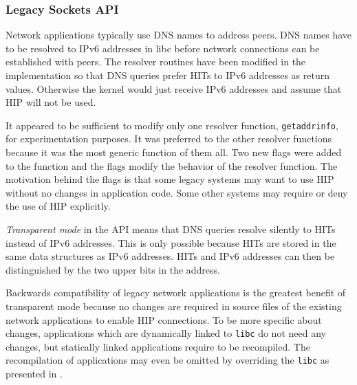 \subsubsection{Legacy Sockets API}
\label{sec:legacy_api_architecture}


Network applications typically use \ac{DNS} names to address
peers. \ac{DNS} names have to be resolved to IPv6 addresses in libc
before network connections can be established with peers. The resolver
routines have been modified in the implementation so that \ac{DNS}
queries prefer \acp{HIT} to IPv6 addresses as return values. Otherwise
the kernel would just receive IPv6 addresses and assume that \ac{HIP}
will not be used.

It appeared to be sufficient to modify only one resolver function,
\verb|getaddrinfo|, for experimentation purposes. It was preferred to
the other resolver functions because it was the most generic function
of them all. Two new flags were added to the function and the flags
modify the behavior of the resolver function. The motivation behind
the flags is that some legacy systems may want to use \ac{HIP} without
no changes in application code. Some other systems may require or deny
the use of \ac{HIP} explicitly.

\textit{Transparent mode} in the \ac{API} means that \ac{DNS} queries
resolve silently to \acp{HIT} instead of IPv6 addresses. This is only
possible because \acp{HIT} are stored in the same data structures as
IPv6 addresses. \acp{HIT} and IPv6 addresses can then be distinguished
by the two upper bits in the address.

Backwards compatibility of legacy network applications is the greatest
benefit of transparent mode because no changes are required in source
files of the existing network applications to enable \ac{HIP}
connections. To be more specific about changes, applications which are
dynamically linked to \verb|libc| do not need any changes, but
statically linked applications require to be recompiled. The
recompilation of applications may even be omitted by overriding the
\verb|libc| as presented in \cite{libcoverride}.


